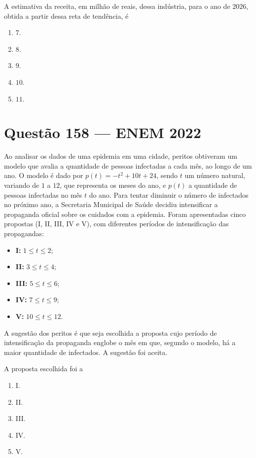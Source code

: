 \documentclass[11pt,a4paper]{article}
\begin{document}
A estimativa da receita, em milhão de reais, dessa indústria, para o ano de $2026$, obtida a partir dessa reta de tendência, é

\begin{enumerate}[label=(\Alph*)]
    \item $7$.
    \item $8$.
    \item $9$.
    \item $10$.
    \item $11$.
\end{enumerate}

\section*{Questão 158 --- ENEM 2022}

Ao analisar os dados de uma epidemia em uma cidade, peritos obtiveram um modelo que avalia a quantidade de pessoas infectadas a cada mês, ao longo de um ano. O modelo é dado por $p(t) = -t^2 + 10t + 24$, sendo $t$ um número natural, variando de $1$ a $12$, que representa os meses do ano, e $p(t)$ a quantidade de pessoas infectadas no mês $t$ do ano. Para tentar diminuir o número de infectados no próximo ano, a Secretaria Municipal de Saúde decidiu intensificar a propaganda oficial sobre os cuidados com a epidemia. Foram apresentadas cinco propostas (I, II, III, IV e V), com diferentes períodos de intensificação das propagandas:

\begin{itemize}
    \item \textbf{I:} $1 \le t \le 2$;
    \item \textbf{II:} $3 \le t \le 4$;
    \item \textbf{III:} $5 \le t \le 6$;
    \item \textbf{IV:} $7 \le t \le 9$;
    \item \textbf{V:} $10 \le t \le 12$.
\end{itemize}

A sugestão dos peritos é que seja escolhida a proposta cujo período de intensificação da propaganda englobe o mês em que, segundo o modelo, há a maior quantidade de infectados. A sugestão foi aceita.

A proposta escolhida foi a

\begin{enumerate}[label=(\Alph*)]
    \item I.
    \item II.
    \item III.
    \item IV.
    \item V.
\end{enumerate}
\end{document}
